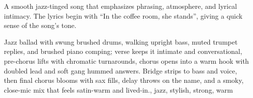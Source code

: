 

\begin{notes}
A smooth jazz-tinged song that emphasizes phrasing, atmosphere, and lyrical intimacy. %
The lyrics begin with “In the coffee room, she stands”, giving a quick sense of the song’s tone.
\end{notes}

\begin{style}
Jazz ballad with swung brushed drums, walking upright bass, muted trumpet replies, and brushed piano comping; verse keeps it intimate and conversational, pre-chorus lifts with chromatic turnarounds, chorus opens into a warm hook with doubled lead and soft gang hummed answers. %
Bridge strips to bass and voice, then final chorus blooms with sax fills, delay throws on the name, and a smoky, close-mic mix that feels satin-warm and lived-in., jazz, stylish, strong, warm
\end{style}

